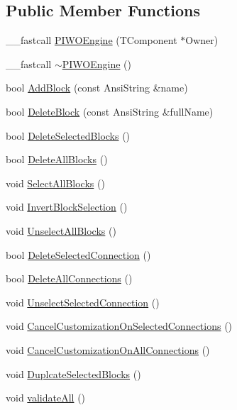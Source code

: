 \subsection*{Public Member Functions}
\begin{CompactItemize}
\item 
\_\-\_\-fastcall \hyperlink{classPIWOEngine_cdfa1d8927a1dec652d405c4f6162f19}{PIWOEngine} (TComponent $\ast$Owner)
\item 
\_\-\_\-fastcall \hyperlink{classPIWOEngine_e7b0e23554e0bbac03efece62653e69f}{$\sim$PIWOEngine} ()
\item 
bool \hyperlink{classPIWOEngine_36ccc94c01c411c848b08900254caf70}{AddBlock} (const AnsiString \&name)
\item 
bool \hyperlink{classPIWOEngine_d55f140db8722ff1601fa675ec779e1d}{DeleteBlock} (const AnsiString \&fullName)
\item 
bool \hyperlink{classPIWOEngine_a11ad8ce77d2e5b026ebc3469bdff0d9}{DeleteSelectedBlocks} ()
\item 
bool \hyperlink{classPIWOEngine_edd85509770c459cd621bfeb5eba4ac7}{DeleteAllBlocks} ()
\item 
void \hyperlink{classPIWOEngine_27e53e5d565cca55d8663a14906ab720}{SelectAllBlocks} ()
\item 
void \hyperlink{classPIWOEngine_b8926ec72c402ff687ac16061c9d35eb}{InvertBlockSelection} ()
\item 
void \hyperlink{classPIWOEngine_60d90f58e1d47c5a12547126700799c7}{UnselectAllBlocks} ()
\item 
bool \hyperlink{classPIWOEngine_60f3cba63905531e827476ad139ddf62}{DeleteSelectedConnection} ()
\item 
bool \hyperlink{classPIWOEngine_93143ee719ccb9645a8d9c197f4fc7b0}{DeleteAllConnections} ()
\item 
void \hyperlink{classPIWOEngine_2ec5c192d058a7a44ab82a30fa331c99}{UnselectSelectedConnection} ()
\item 
void \hyperlink{classPIWOEngine_2e52cfe4cc826cd43595ca9c7ae979f9}{CancelCustomizationOnSelectedConnections} ()
\item 
void \hyperlink{classPIWOEngine_0e28412b868f3042c7bf50e9ee8c40fc}{CancelCustomizationOnAllConnections} ()
\item 
void \hyperlink{classPIWOEngine_6e37ad69880f3d9a9ad7cf9b57d894a9}{DuplcateSelectedBlocks} ()
\item 
void \hyperlink{classPIWOEngine_3585d1f4c45df99a02c36af9cab8e343}{validateAll} ()
\item 

\end{CompactItemize}
